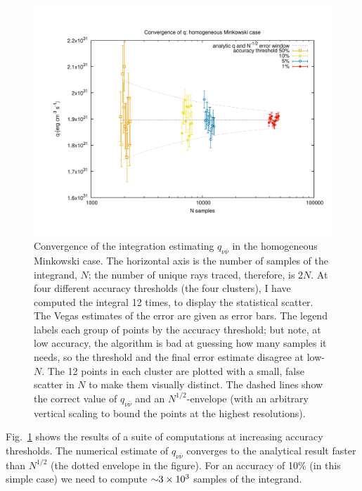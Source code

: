 \begin{figure}
  \centering
  \includegraphics[width=16cm]{Figures/convergence_homogeneous_minkowski}
  \caption[Convergence of $q_{\nu\bar{\nu}}$ in the homogeneous Minkowski case]{
    Convergence of the integration estimating $q_{\nu\bar{\nu}}$ in the
    homogeneous Minkowski case.
    The horizontal axis is the number of samples of the integrand, $N$;
    the number of unique rays traced, therefore, is $2N$.
    At four different accuracy thresholds (the four clusters), I have computed
    the integral 12 times, to display the statistical scatter.
    The Vegas estimates of the error are given as error bars.
    The legend labels each group of points by the accuracy threshold; but note,
    at low accuracy, the algorithm is bad at guessing how many samples it needs,
    so the threshold and the final error estimate disagree at low-$N$.
    The 12 points in each cluster are plotted with a small, false scatter in $N$
    to make them visually distinct.
    The dashed lines show the correct value of $q_{\nu\bar{\nu}}$ and an
    $N^{1/2}$-envelope (with an arbitrary vertical scaling to bound the points
    at the highest resolutions).
  }
  \label{fig:convergence_homo_mink}
\end{figure}

Fig.~\ref{fig:convergence_homo_mink} shows the results of a suite of
computations at increasing accuracy thresholds.
The numerical estimate of $q_{\nu\bar{\nu}}$ converges to the analytical result
faster than $N^{1/2}$ (the dotted envelope in the figure).
For an accuracy of 10\% (in this simple case) we need to compute
$\mathord{\sim}3\times10^3$ samples of the integrand.

